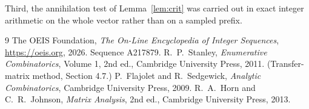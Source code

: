 \documentclass[11pt,a4paper]{article}
\theoremstyle{plain}
\theoremstyle{definition}
\begin{document}
Third, the annihilation test of Lemma~\ref{lem:crit} was carried out in exact integer
arithmetic on the whole vector rather than on a sampled prefix.

\begin{thebibliography}{9}
 The OEIS Foundation, \emph{The On-Line Encyclopedia of Integer
Sequences}, \url{https://oeis.org}, 2026. Sequence A217879.
 R.~P.~Stanley, \emph{Enumerative Combinatorics}, Volume 1, 2nd ed.,
Cambridge University Press, 2011. (Transfer-matrix method, Section 4.7.)
 P.~Flajolet and R.~Sedgewick, \emph{Analytic Combinatorics}, Cambridge
University Press, 2009.
 R.~A.~Horn and C.~R.~Johnson, \emph{Matrix Analysis}, 2nd ed., Cambridge
University Press, 2013.
\end{thebibliography}
\end{document}

